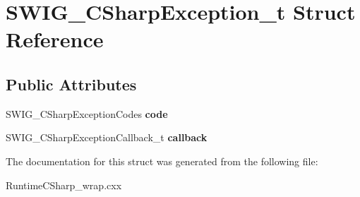 \hypertarget{struct_s_w_i_g___c_sharp_exception__t}{}\section{S\+W\+I\+G\+\_\+\+C\+Sharp\+Exception\+\_\+t Struct Reference}
\label{struct_s_w_i_g___c_sharp_exception__t}
\subsection*{Public Attributes}
\begin{DoxyCompactItemize}
\item 
S\+W\+I\+G\+\_\+\+C\+Sharp\+Exception\+Codes {\bfseries code}\hypertarget{struct_s_w_i_g___c_sharp_exception__t_aafa02b02869cd0423dcee68c867b4e53}{}\label{struct_s_w_i_g___c_sharp_exception__t_aafa02b02869cd0423dcee68c867b4e53}

\item 
S\+W\+I\+G\+\_\+\+C\+Sharp\+Exception\+Callback\+\_\+t {\bfseries callback}\hypertarget{struct_s_w_i_g___c_sharp_exception__t_a6dccb706a135c7f0e48102b3b528f2bc}{}\label{struct_s_w_i_g___c_sharp_exception__t_a6dccb706a135c7f0e48102b3b528f2bc}

\end{DoxyCompactItemize}


The documentation for this struct was generated from the following file\+:\begin{DoxyCompactItemize}
\item 
Runtime\+C\+Sharp\+\_\+wrap.\+cxx\end{DoxyCompactItemize}
